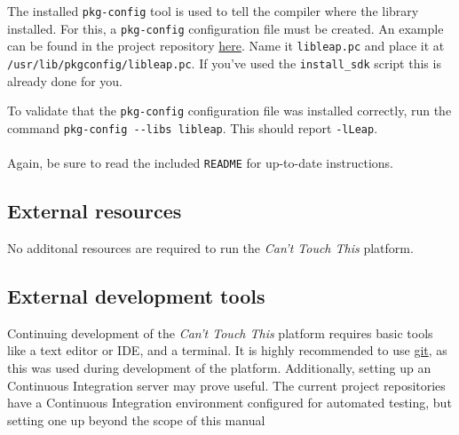 \documentclass{standalone}
\begin{document}
  The installed \verb_pkg-config_ tool is used to tell the compiler where the
  library installed. For this, a \verb_pkg-config_ configuration file must be
  created. An example can be found in the project repository
  \href{https://gitlab.com/timvisee/cant-touch-this/blob/ece65fab15b3c088e57628dc0c82474efddbbfd2/ci/libleap.pc}{here}.
  Name it \verb_libleap.pc_ and place it at
  \verb_/usr/lib/pkgconfig/libleap.pc_. If you've used the \verb`install_sdk`
  script this is already done for you.

  To validate that the \verb_pkg-config_ configuration file was installed
  correctly, run the command \verb_pkg-config --libs libleap_. This should
  report \verb_-lLeap_.

  \paragraph{}
  Again, be sure to read the included \verb_README_ for up-to-date instructions.

  \subsection{External resources}
  No additonal resources are required to run the \textit{Can't Touch This}
  platform.

  \subsection{External development tools}
  Continuing development of the \textit{Can't Touch This} platform requires
  basic tools like a text editor or IDE, and a terminal. It is highly
  recommended to use \href{https://git-scm.com/}{git}, as this was used during
  development of the platform. Additionally, setting up an Continuous Integration server may prove
  useful. The current project repositories have a Continuous Integration
  environment configured for automated testing, but setting one up beyond the
  scope of this manual 

  \clearpage
\end{document}

